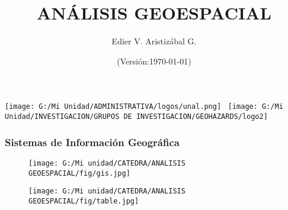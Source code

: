 \documentclass[14pt]{beamer}
\title[GIS]{ANÁLISIS GEOESPACIAL}
\author[Edier Aristizábal]{Edier V. Aristizábal G.}
\institute{\emph{evaristizabalg@unal.edu.co}}
\date{(Versión:\today)}
\begin{document}
\begin{frame}
\titlepage
\centering
	\texttt{[image: G:/Mi Unidad/ADMINISTRATIVA/logos/unal.png]}\hspace*{4.75cm}~%
   	\texttt{[image: G:/Mi Unidad/INVESTIGACION/GRUPOS DE INVESTIGACION/GEOHAZARDS/logo2]} 
\end{frame}
\begin{frame}\frametitle{Sistemas de Información Geográfica}
  \begin{figure}
    \centering
    \texttt{[image: G:/Mi unidad/CATEDRA/ANALISIS GEOESPACIAL/fig/gis.jpg]}
  \end{figure}
\end{frame}

\begin{frame}
  \begin{figure}
    \centering
    \texttt{[image: G:/Mi unidad/CATEDRA/ANALISIS GEOESPACIAL/fig/table.jpg]}
  \end{figure}
\end{frame}
\end{document}
